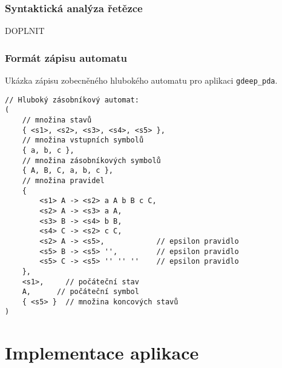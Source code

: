 \subsubsection{Syntaktická analýza řetězce}
DOPLNIT

\subsubsection{Formát zápisu automatu}\label{kap_aplikace_format}




\begin{Example} \label{example_format}
Ukázka zápisu zobecněného hlubokého automatu pro aplikaci \texttt{gdeep\_pda}.

\begin{verbatim}
// Hluboký zásobníkový automat:
(
    // množina stavů
    { <s1>, <s2>, <s3>, <s4>, <s5> },
    // množina vstupních symbolů
    { a, b, c },
    // množina zásobníkových symbolů
    { A, B, C, a, b, c },
    // množina pravidel
    { 
        <s1> A -> <s2> a A b B c C,
        <s2> A -> <s3> a A,
        <s3> B -> <s4> b B,
        <s4> C -> <s2> c C,
        <s2> A -> <s5>,            // epsilon pravidlo
        <s5> B -> <s5> '',         // epsilon pravidlo
        <s5> C -> <s5> '' '' ''    // epsilon pravidlo
    },
    <s1>,     // počáteční stav
    A,      // počáteční symbol
    { <s5> }  // množina koncových stavů	
)
\end{verbatim}
\end{Example}

\section{Implementace aplikace}

